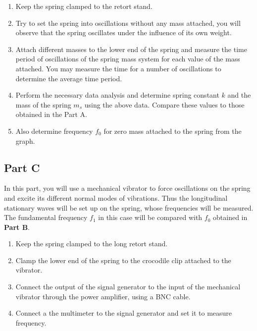 \begin{refsection}
\begin{enumerate}
\item Keep the spring clamped to the retort stand.

\item Try to set the spring into oscillations without any mass attached, you will observe that the spring oscillates under the influence of its own weight.

\item Attach different masses to the lower end of the spring and measure the time period of oscillations of the spring mass system for each value of the mass attached. You may measure the time for a number of oscillations to determine the average time period.

\item Perform the necessary data analysis and determine spring constant $k$ and the mass of the spring $m_s$ using the above data. Compare these values to those obtained in the Part A.

\item Also determine frequency $f_0$ for zero mass attached to the spring from the graph.

\end{enumerate}


\subsection*{Part C}

In this part, you will use a mechanical vibrator to force oscillations on the spring and excite its different normal modes of vibrations. Thus the longitudinal stationary waves will be set up on the spring, whose frequencies will be measured. The fundamental frequency $f_1$ in this case will be compared with $f_0$ obtained in \textbf{Part B}.

\begin{enumerate}
\item Keep the spring clamped to the long retort stand.

\item Clamp the lower end of the spring to the crocodile clip attached to the vibrator.

\item Connect the output of the signal generator to the input of the mechanical vibrator through the power amplifier, using a BNC cable.

\item Connect a the multimeter to the signal generator and set it to measure frequency.


\end{enumerate}
\end{refsection}
